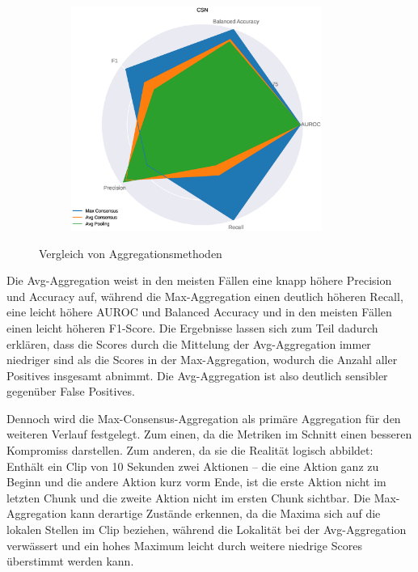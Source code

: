 \begin{figure}[htbp!]
\begin{subfigure}{.33\textwidth}
    \end{subfigure}%
    \begin{subfigure}{.33\textwidth}
        \centering
        \includegraphics[width=0.9\textwidth, keepaspectratio, interpolate]{img/07_consensus_CSN.eps}
    \end{subfigure}
    \caption{Vergleich von Aggregationsmethoden}
    \label{fig:consensus}
\end{figure}

Die Avg-Aggregation weist in den meisten Fällen eine knapp höhere Precision und Accuracy auf, während die Max-Aggregation einen deutlich höheren Recall, eine leicht höhere AUROC und Balanced Accuracy und in den meisten Fällen einen leicht höheren F1-Score.
Die Ergebnisse lassen sich zum Teil dadurch erklären, dass die Scores durch die Mittelung der Avg-Aggregation immer niedriger sind als die Scores in der Max-Aggregation, wodurch die Anzahl aller Positives insgesamt abnimmt.
Die Avg-Aggregation ist also deutlich sensibler gegenüber False Positives.

Dennoch wird die Max-Consensus-Aggregation als primäre Aggregation für den weiteren Verlauf festgelegt.
Zum einen, da die Metriken im Schnitt einen besseren Kompromiss darstellen.
Zum anderen, da sie die Realität logisch abbildet:
Enthält ein Clip von 10 Sekunden zwei Aktionen -- die eine Aktion ganz zu Beginn und die andere Aktion kurz vorm Ende, ist die erste Aktion nicht im letzten Chunk und die zweite Aktion nicht im ersten Chunk sichtbar.
Die Max-Aggregation kann derartige Zustände erkennen, da die Maxima sich auf die lokalen Stellen im Clip beziehen, während die Lokalität bei der Avg-Aggregation verwässert und ein hohes Maximum leicht durch weitere niedrige Scores überstimmt werden kann.
